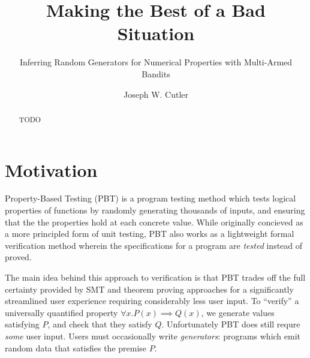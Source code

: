\documentclass[sigconf,nonacm,review,anonymous]{acmart}
\begin{document}
\title{Making the Best of a Bad Situation}
\subtitle{Inferring Random Generators for Numerical Properties with Multi-Armed Bandits}

\author{Joseph W. Cutler}

\renewcommand{\shortauthors}{Cutler}

\begin{abstract}
    TODO
\end{abstract}

\maketitle


\section{Motivation}
Property-Based Testing (PBT) \cite{qc} is a program testing method which tests
logical properties of functions by randomly generating thousands of inputs, and ensuring that
the the properties hold at each concrete value. While originally concieved as a more
principled form of unit testing, PBT also works as a lightweight formal verification method
wherein the specifications for a program are \emph{tested} instead of proved.

The main idea behind this approach to verification is that PBT trades off the
full certainty provided by SMT and theorem proving approaches for a significantly streamlined
user experience requiring considerably less user input. To ``verify'' a universally quantified property
$\forall x. P(x) \implies Q(x)$, we generate values satisfying $P$, and check that they satisfy $Q$.
Unfortunately PBT does still requre \emph{some} user input. Users must occasionally write \emph{generators}: programs which
emit random data that satisfies the premise $P$.
\end{document}
